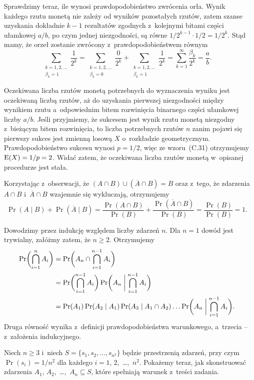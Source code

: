 Sprawdzimy teraz, ile wynosi prawdopodobieństwo zwrócenia orła. Wynik każdego rzutu monetą nie zależy od wyników pozostałych rzutów, zatem szanse uzyskania dokładnie $k-1$ rezultatów zgodnych z~kolejnymi bitami części ułamkowej $a/b$, po czym jednej niezgodności, są równe $1/2^{k-1}\cdot1/2=1/2^k$. Stąd mamy, że orzeł zostanie zwrócony z~prawdopodobieństwem równym
\[
    \sum_{\substack{k=1,2,\dots\\\beta_k=1}}\!\frac{1}{2^k} = \sum_{\substack{k=1,2,\dots\\\beta_k=0}}\!\frac{0}{2^k}+\sum_{\substack{k=1,2,\dots\\\beta_k=1}}\!\frac{1}{2^k} = \sum_{k=1}^\infty\frac{\beta_k}{2^k} = \frac{a}{b}.
\]

Oczekiwana liczba rzutów monetą potrzebnych do wyznaczenia wyniku jest oczekiwaną liczbą rzutów, aż do uzyskania pierwszej niezgodności między wynikiem rzutu a~odpowiednim bitem rozwinięcia binarnego części ułamkowej liczby $a/b$. Jeśli przyjmiemy, że sukcesem jest wynik rzutu monetą niezgodny z~bieżącym bitem rozwinięcia, to liczba potrzebnych rzutów $n$ zanim pojawi się pierwszy sukces jest zmienną losową $X$ o~rozkładzie geometrycznym. Prawdopodobieństwo sukcesu wynosi $p=1/2$, więc ze wzoru~(C.31) otrzymujemy $\operatorname{E}(X)=1/p=2$. Widać zatem, że oczekiwana liczba rzutów monetą w~opisanej procedurze jest stała.

\exercise %
Korzystając z~obserwacji, że $(A\cap B)\cup(\overline{A}\cap B)=B$ oraz z~tego, że zdarzenia $A\cap B$ i~$\overline{A}\cap B$ wzajemnie się wykluczają, otrzymujemy
\[
	\Pr(A\mid B)+\Pr(\overline{A}\mid B) = \frac{\Pr(A\cap B)}{\Pr(B)}+\frac{\Pr(\overline{A}\cap B)}{\Pr(B)} = \frac{\Pr(B)}{\Pr(B)} = 1.
\]

\exercise %
Dowodzimy przez indukcję względem liczby zdarzeń $n$. Dla $n=1$ dowód jest trywialny, załóżmy zatem, że $n\ge2$. Otrzymujemy
\begin{align*}
	\Pr\biggl(\bigcap_{i=1}^nA_i\biggr) &= \Pr\biggl(A_n\cap\bigcap_{i=1}^{n-1}A_i\biggr) \\
	&= \Pr\biggl(\bigcap_{i=1}^{n-1}A_i\biggr)\Pr\biggl(A_n\biggm|\bigcap_{i=1}^{n-1}A_i\biggr) \\
	&= \Pr(A_1)\Pr(A_2\mid A_1)\Pr(A_3\mid A_1\cap A_2)\dots\Pr\biggl(A_n\biggm|\bigcap_{i=1}^{n-1}A_i\biggr).
\end{align*}
Druga równość wynika z~definicji prawdopodobieństwa warunkowego, a~trzecia -- z~założenia indukcyjnego.

\exercise %
Niech $n\ge3$ i~niech $S=\{s_1,s_2,\dots,s_{n^2}\}$ będzie przestrzenią zdarzeń, przy czym $\Pr(s_i)=1/n^2$ dla każdego $i=1$, 2,~\dots,~$n^2$. Pokażemy teraz, jak skonstruować zdarzenia $A_1$, $A_2$,~\dots,~$A_n\subseteq S$, które spełniają warunek z~treści zadania.

